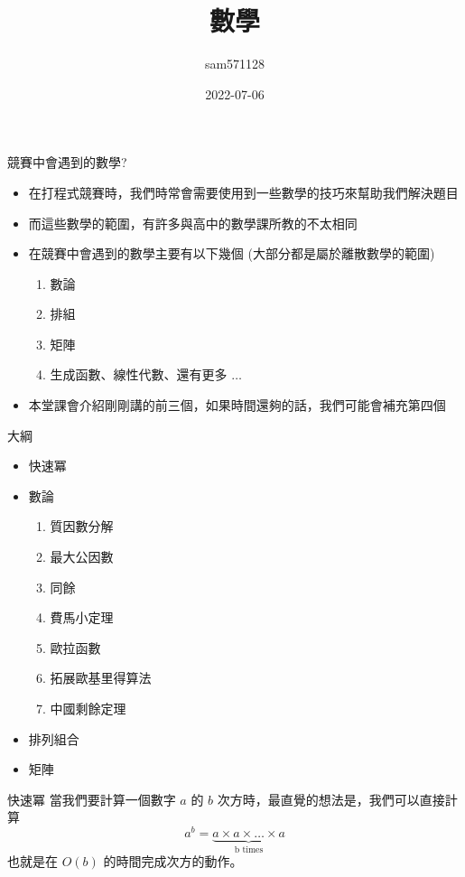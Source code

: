 \documentclass[aspectratio=169]{beamer}
\title{數學}
\author{sam571128}
\date{2022-07-06}
\begin{document}
\frame{\titlepage}

\begin{frame}{競賽中會遇到的數學?}
    \begin{itemize}
        \item 在打程式競賽時，我們時常會需要使用到一些數學的技巧來幫助我們解決題目
        \item 而這些數學的範圍，有許多與高中的數學課所教的不太相同
        \item 在競賽中會遇到的數學主要有以下幾個 (大部分都是屬於離散數學的範圍)
            \begin{enumerate}
                \item 數論
                \item 排組
                \item 矩陣
                \item 生成函數、線性代數、還有更多 $\ldots$
            \end{enumerate}
        \item<2-> 本堂課會介紹剛剛講的前三個，如果時間還夠的話，我們可能會補充第四個
    \end{itemize}
\end{frame}

\begin{frame}{大綱}
    \begin{itemize}
        \item 快速冪
        \item 數論
            \begin{enumerate}
                \item 質因數分解
                \item 最大公因數
                \item 同餘
                \item 費馬小定理
                \item 歐拉函數
                \item 拓展歐基里得算法
                \item 中國剩餘定理
            \end{enumerate}
        \item 排列組合
        \item 矩陣
    \end{itemize}
\end{frame}

\begin{frame}{快速冪} 
    當我們要計算一個數字 $a$ 的 $b$ 次方時，最直覺的想法是，我們可以直接計算
    $$a^b = \underbrace{a \times a \times \dots \times a}_\text{b times}$$
    也就是在 $O(b)$ 的時間完成次方的動作。
\end{frame}
\end{document}
